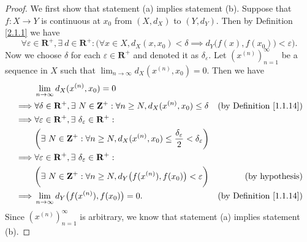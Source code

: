 \begin{proof}
    We first show that statement (a) implies statement (b).
    Suppose that \(f : X \to Y\) is continuous at \(x_0\) from \((X, d_X)\) to \((Y, d_Y)\).
    Then by Definition \ref{2.1.1} we have
    \[
        \forall \varepsilon \in \mathbf{R}^+, \exists\ d \in \mathbf{R}^+ : \Big(\forall x \in X, d_X(x, x_0) < \delta \implies d_Y\big(f(x), f(x_0)\big) < \varepsilon\Big).
    \]
    Now we choose \(\delta\) for each \(\varepsilon \in \mathbf{R}^+\) and denoted it as \(\delta_\varepsilon\).
    Let \((x^{(n)})_{n = 1}^\infty\) be a sequence in \(X\) such that \(\lim_{n \to \infty} d_X(x^{(n)}, x_0) = 0\).
    Then we have
    \begin{align*}
                 & \lim_{n \to \infty} d_X(x^{(n)}, x_0) = 0                                                                                                                                  \\
        \implies & \forall \delta \in \mathbf{R}^+, \exists\ N \in \mathbf{Z}^+ : \forall n \geq N, d_X(x^{(n)}, x_0) \leq \delta                       & \text{(by Definition \ref{1.1.14})} \\
        \implies & \forall \varepsilon \in \mathbf{R}^+, \exists\ \delta_\varepsilon \in \mathbf{R}^+ :                                                                                       \\
                 & \bigg(\exists\ N \in \mathbf{Z}^+ : \forall n \geq N, d_X(x^{(n)}, x_0) \leq \frac{\delta_\varepsilon}{2} < \delta_\varepsilon\bigg)                                       \\
        \implies & \forall \varepsilon \in \mathbf{R}^+, \exists\ \delta_\varepsilon \in \mathbf{R}^+ :                                                                                       \\
                 & \bigg(\exists\ N \in \mathbf{Z}^+ : \forall n \geq N, d_Y\big(f(x^{(n)}), f(x_0)\big) < \varepsilon\bigg)                            & \text{(by hypothesis)}              \\
        \implies & \lim_{n \to \infty} d_Y\big(f(x^{(n)}), f(x_0)\big) = 0.                                                                             & \text{(by Definition \ref{1.1.14})}
    \end{align*}
    Since \((x^{(n)})_{n = 1}^\infty\) is arbitrary, we know that statement (a) implies statement (b).


\end{proof}
